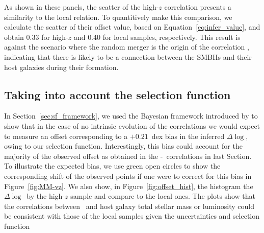 \documentclass[apj]{emulateapj}
\begin{document}
As shown in these panels, the scatter of the high-$z$ correlation presents a similarity to the local relation. To quantitively make this comparison, we calculate the scatter of their offset value, based on Equation~\ref{eq:infer_value}, and obtain $0.33$ for high-$z$ and $0.40$ for local samples, respectively. This result is against the scenario where the random merger is the origin of the correlation \citep{Peng2007}, indicating that there is likely to be a connection between the SMBHs and their host galaxies during their formation.





\subsection{Taking into account the selection function}
\label{select_eff}

In Section~\ref{sec:sf_framework}, we used the Bayesian framework introduced by \citet{Schulze2011} to show that in the case of no intrinsic evolution of the correlations we would expect to measure an offset corresponding to a $+0.21$~dex bias in the inferred $\Delta \log$\mbh, owing to our selection function. Interestingly, this bias could account for the majority of the observed offset as obtained in the \mbh-\smass\ correlations in last Section. %
To illustrate the expected bias, we use green open circles to show the corresponding shift of the observed points if one were to correct for this bias in Figure~\ref{fig:MM-vz}. We also show, in Figure~\ref{fig:offset_hist}, the histogram the $\Delta \log$\mbh\ by the high-$z$ sample and compare to the local ones. 
The plots show that the correlations between \mbh\ and host galaxy total stellar mass or luminosity could be consistent with those of the local samples given the uncertainties and selection function
\end{document}
